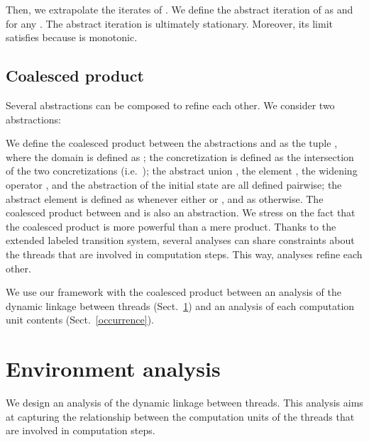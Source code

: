 \documentclass{article}
\newcommand{\rec}{?}
\newcommand{\eme}{!}
\newcommand{\Vrec}{V_{\rec}}
\newcommand{\Veme}{V_{\eme}}
\begin{document}
Then, we extrapolate the iterates of .
We define the abstract iteration \cite{cc:frameworks,cc:galois-widening} of  as   
 and  for any .
The abstract iteration 
is ultimately stationary.
Moreover, its limit  satisfies  because  is monotonic.

\subsection{Coalesced product}
\label{product}
Several abstractions can be composed to refine each other.
We consider two abstractions:

We define the coalesced product between the abstractions  and  as the tuple , 
where the domain  is defined as ; 
the concretization  is defined as the intersection of the two concretizations (i.e.~);
the abstract union , the element , the widening operator , and the abstraction  of the initial state  are all defined pairwise; the abstract element  is defined as 
 whenever either  or 
, and as
 otherwise.
The coalesced product between  and  is also an abstraction. 
We stress on the fact that the coalesced product is more powerful than a mere product. Thanks to the extended labeled transition system, several analyses can share 
constraints about the threads that are involved 
in computation steps. This way, analyses refine each other. 

We use our framework with the coalesced product between an analysis of the dynamic linkage between  threads (Sect.~\ref{environment}) and an analysis of each computation unit contents (Sect.~\ref{occurrence}).

\section{Environment analysis}
\label{environment}

\newcommand{\allconstraint}{\textit{Constraints}(\Vrec,\Veme)}
\newcommand{\constraintset}{C}
\newcommand{\constraint}{c}

We design an analysis of the dynamic linkage between threads. 
This analysis aims at capturing the relationship between the computation units of the threads that are involved in computation steps.
\end{document}
